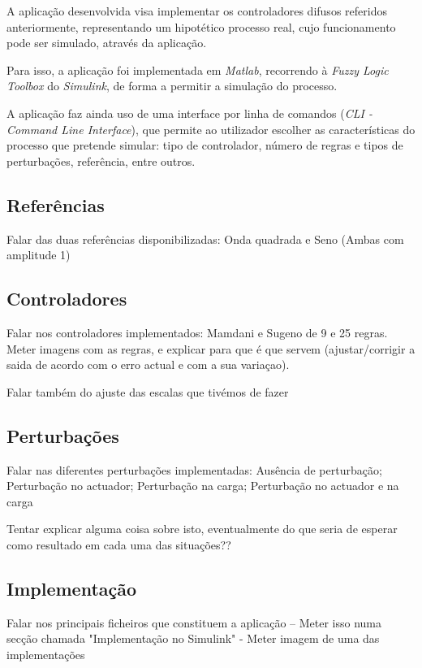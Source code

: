 \documentclass{article}
\begin{document}
A aplicação desenvolvida visa implementar os controladores difusos referidos anteriormente, representando um hipotético processo real, cujo funcionamento pode ser simulado, através da aplicação.

Para isso, a aplicação foi implementada em \emph{Matlab}, recorrendo à \emph{Fuzzy Logic Toolbox} do \emph{Simulink}, de forma a permitir a simulação do processo.

A aplicação faz ainda uso de uma interface por linha de comandos (\emph{CLI - Command Line Interface}), que permite ao utilizador escolher as características do processo que pretende simular: tipo de controlador, número de regras e tipos de perturbações, referência, entre outros.

\subsection{Referências}



Falar das duas referências disponibilizadas: Onda quadrada e Seno (Ambas com amplitude 1)

\subsection{Controladores}

Falar nos controladores implementados: Mamdani e Sugeno de 9 e 25 regras. Meter imagens com as regras, e explicar para que é que servem (ajustar/corrigir a saida de acordo com o erro actual e com a sua variaçao).

Falar também do ajuste das escalas que tivémos de fazer

\subsection{Perturbações}

Falar nas diferentes perturbações implementadas: Ausência de perturbação; Perturbação no actuador; Perturbação na carga; Perturbação no actuador e na carga

Tentar explicar alguma coisa sobre isto, eventualmente do que seria de esperar como resultado em cada uma das situações??

\subsection{Implementação}

Falar nos principais ficheiros que constituem a aplicação -- Meter isso numa secção chamada "Implementação no Simulink" - Meter imagem de uma das implementações
\end{document}
